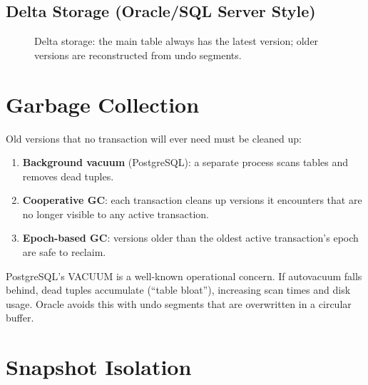 \subsection{Delta Storage (Oracle/SQL Server Style)}

\begin{figure}[H]
\centering
{}
\caption{Delta storage: the main table always has the latest version; older versions are reconstructed from undo segments.}
\end{figure}

\section{Garbage Collection}

Old versions that no transaction will ever need must be cleaned up:

\begin{enumerate}[nosep]
  \item \textbf{Background vacuum} (PostgreSQL): a separate process scans tables and removes dead tuples.
  \item \textbf{Cooperative GC}: each transaction cleans up versions it encounters that are no longer visible to any active transaction.
  \item \textbf{Epoch-based GC}: versions older than the oldest active transaction's epoch are safe to reclaim.
\end{enumerate}

\begin{warningbox}
PostgreSQL's VACUUM is a well-known operational concern.  If autovacuum falls behind, dead tuples accumulate (``table bloat''), increasing scan times and disk usage.  Oracle avoids this with undo segments that are overwritten in a circular buffer.
\end{warningbox}

\section{Snapshot Isolation}

